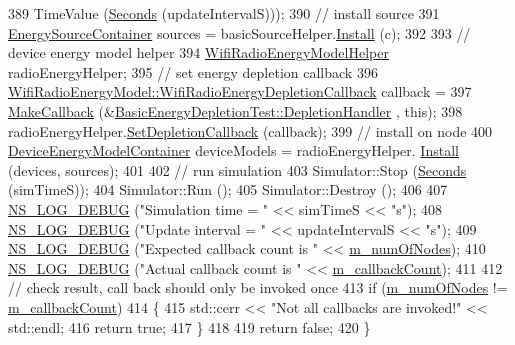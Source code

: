 \begin{DoxyCode}
389                          TimeValue (\hyperlink{group__timecivil_ga33c34b816f8ff6628e33d5c8e9713b9e}{Seconds} (updateIntervalS)));
390   \textcolor{comment}{// install source}
391   \hyperlink{classns3_1_1EnergySourceContainer}{EnergySourceContainer} sources = basicSourceHelper.\hyperlink{classns3_1_1EnergySourceHelper_ac52e48ef79c83537cc0bba02df8d91a1}{Install} (c);
392 
393   \textcolor{comment}{// device energy model helper}
394   \hyperlink{classns3_1_1WifiRadioEnergyModelHelper}{WifiRadioEnergyModelHelper} radioEnergyHelper;
395   \textcolor{comment}{// set energy depletion callback}
396   \hyperlink{classns3_1_1Callback}{WifiRadioEnergyModel::WifiRadioEnergyDepletionCallback}
       callback =
397     \hyperlink{group__makecallbackmemptr_ga9376283685aa99d204048d6a4b7610a4}{MakeCallback} (&\hyperlink{classBasicEnergyDepletionTest_af949ebacd8c4fbfbb48d982d15350d23}{BasicEnergyDepletionTest::DepletionHandler}
      , \textcolor{keyword}{this});
398   radioEnergyHelper.\hyperlink{classns3_1_1WifiRadioEnergyModelHelper_a5b2233e44f4dd5cb6193901aefc975de}{SetDepletionCallback} (callback);
399   \textcolor{comment}{// install on node}
400   \hyperlink{classns3_1_1DeviceEnergyModelContainer}{DeviceEnergyModelContainer} deviceModels = radioEnergyHelper.
      \hyperlink{classns3_1_1DeviceEnergyModelHelper_a085a4854e96ff8f314a9ebec93e6c4eb}{Install} (devices, sources);
401 
402   \textcolor{comment}{// run simulation}
403   Simulator::Stop (\hyperlink{group__timecivil_ga33c34b816f8ff6628e33d5c8e9713b9e}{Seconds} (simTimeS));
404   Simulator::Run ();
405   Simulator::Destroy ();
406 
407   \hyperlink{group__logging_ga413f1886406d49f59a6a0a89b77b4d0a}{NS\_LOG\_DEBUG} (\textcolor{stringliteral}{"Simulation time = "} << simTimeS << \textcolor{stringliteral}{"s"});
408   \hyperlink{group__logging_ga413f1886406d49f59a6a0a89b77b4d0a}{NS\_LOG\_DEBUG} (\textcolor{stringliteral}{"Update interval = "} << updateIntervalS << \textcolor{stringliteral}{"s"});
409   \hyperlink{group__logging_ga413f1886406d49f59a6a0a89b77b4d0a}{NS\_LOG\_DEBUG} (\textcolor{stringliteral}{"Expected callback count is "} << \hyperlink{classBasicEnergyDepletionTest_a80ec49961c2a9652f8648a3e5fe6b6fa}{m\_numOfNodes});
410   \hyperlink{group__logging_ga413f1886406d49f59a6a0a89b77b4d0a}{NS\_LOG\_DEBUG} (\textcolor{stringliteral}{"Actual callback count is "} << \hyperlink{classBasicEnergyDepletionTest_afb076ced2dd133051644c63e7428098b}{m\_callbackCount});
411 
412   \textcolor{comment}{// check result, call back should only be invoked once}
413   \textcolor{keywordflow}{if} (\hyperlink{classBasicEnergyDepletionTest_a80ec49961c2a9652f8648a3e5fe6b6fa}{m\_numOfNodes} != \hyperlink{classBasicEnergyDepletionTest_afb076ced2dd133051644c63e7428098b}{m\_callbackCount})
414     \{
415       std::cerr << \textcolor{stringliteral}{"Not all callbacks are invoked!"} << std::endl;
416       \textcolor{keywordflow}{return} \textcolor{keyword}{true};
417     \}
418 
419   \textcolor{keywordflow}{return} \textcolor{keyword}{false};
420 \}
\end{DoxyCode}


